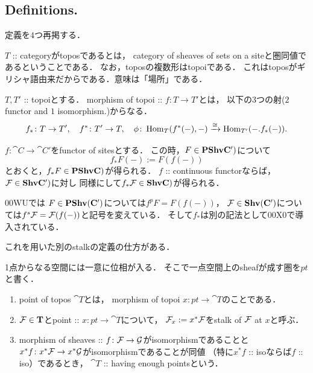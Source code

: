 \subsection{Definitions.}
    
定義を$4$つ再掲する．
\begin{Def}
    \begin{myenum}
    \item
    $T$ :: categoryがtoposであるとは，
    category of sheaves of sets on a siteと圏同値であるということである．
    なお，toposの複数形はtopoiである．
    これはtoposがギリシャ語由来だからである．意味は「場所」である．

    \item
    $T, T'$ :: topoiとする．
    morphism of topoi :: $f \colon T \to T'$とは，
    以下の$3$つの射($2$ functor and $1$ isomorphism.)からなる．
    \[
        f_* \colon T \to T', \quad f^* \colon T' \to T,
        \quad \phi \colon \operatorname{Hom}_{T}(f^*(-), -) \xrightarrow{\cong} \operatorname{Hom}_{T'}(-. f_*(-)).
    \]
    \end{myenum}
\end{Def}

\begin{Def}
    $f \colon \cat{C} \to \cat{C}'$をfunctor of sitesとする．
    この時，$F \in \mathbf{PShv}\mathbf{C}')$について
    \[ f_*F(-):=F(f(-)) \]
    とおくと，$f_* F \in \mathbf{PShv}\mathbf{C})$が得られる．
    $f$ :: continuous functorならば，
    $\mathcal{F} \in \mathbf{Shv}\mathbf{C}')$に対し
    同様にして$f_*\mathcal{F} \in \mathbf{Shv}\mathbf{C})$が得られる．
\end{Def}

\begin{Remark}
    \cite{SP} 00WUでは
    $F \in \mathbf{PShv}(\mathbf{C}')$については$f^{p}F=F(f(-))$，
    $\mathcal{F} \in \mathbf{Shv}(\mathbf{C}')$については$f^{s}\mathcal{F}=\mathcal{F}(f(-))$と記号を変えている．
    そして$f_*$は別の記法として00X0で導入されている．
\end{Remark}

これを用いた別のstalkの定義の仕方がある．
\begin{Def}
    1点からなる空間には一意に位相が入る．
    そこで一点空間上のsheafが成す圏を$pt$と書く．
    \begin{enumerate}[label=(\roman*)]
        \item
            point of topos $\cat{T}$とは，
            morphism of topoi $x \colon pt \to \cat{T}$のことである．
        \item
            $\mathcal{F} \in \mathbf{T}$とpoint :: $x \colon pt \to \cat{T}$について，
            $\mathcal{F}_x := x^*\mathcal{F}$をstalk of $\mathcal{F}$ at $x$と呼ぶ．
        \item
            morphism of sheaves :: $f \colon \mathcal{F} \to \mathcal{G}$がisomorphismであることと
            $x^* f \colon x^* \mathcal{F} \to x^* \mathcal{G}$がisomorphismであることが同値
            （特に$x^*f$ :: isoならば$f$ :: iso）であるとき，
            $\cat{T}$ :: having enough pointsという．
    \end{enumerate}
\end{Def}

